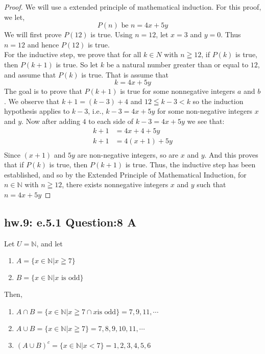 \begin{proof}
    

    We will use a extended principle of mathematical induction. For this proof, we let,
        \begin{equation*}
            P(n) \text{ be } n = 4x + 5y
        \end{equation*}
    We will first prove $P(12)$ is true. Using $n=12$, let $x=3$ and $y=0$. Thus $n=12$ and hence $P(12)$ is true. \\
    
    For the inductive step, we prove that for all $k \in N$ with $n \geqq 12$, if $P(k)$ is true, then $P(k+1)$ is true. So let $k$ be a natural number greater than or equal to $12$, and assume that $P(k)$ is true. That is assume that 
        \begin{equation*}
            k = 4x + 5y
        \end{equation*}
    The goal is to prove that $P(k+1)$ is true for some nonnegative integers $a$ and $b$. We observe that $k+1 = (k-3) + 4$ and $12 \leqq k-3 < k$ so the induction hypothesis applies to $k-3$, i.e., $k-3 = 4x + 5y$ for some non-negative integers $x$ and $y$. Now after adding $4$ to each side of $k-3 = 4x + 5y$ we see that:
        \begin{align*}
            k+1 & = 4x + 4 + 5y \\
            k+1 & = 4(x+1) + 5y \\
        \end{align*}
    Since $(x+1)$ and $5y$ are non-negative integers, so are $x$ and $y$. And this proves that if $P(k)$ is true, then $P(k+1)$ is true. Thus, the inductive step has been established, and so by the Extended Principle of Mathematical Induction, for $n \in \mathbb{N}$ with $n \geqq 12$, there exists nonnegative integers $x$ and $y$ such that $n = 4x + 5y$
\end{proof}


\newpage
\subsection{hw.9: e.5.1 Question:8 A}
Let $U = \mathbb{N}$, and let
    \begin{enumerate}
        \item $A = \{ x \in \mathbb{N} | x \geqq 7 \}$ 
        \item $B = \{ x \in \mathbb{N} | x \text{ is odd} \}$
    \end{enumerate}
Then,
 \begin{enumerate}
     \item $A \cap B = \{ x \in \mathbb{N} | x \geqq 7 \cap x \text{is odd} \} = 7, 9, 11, \cdots $
     \item $A \cup B = \{ x \in \mathbb{N} | x \geqq 7 \} = 7,8, 9, 10,11,  \cdots $
     \item $(A \cup B)^c = \{ x \in \mathbb{N} | x < 7 \} = 1,2, 3,4,5,6 $
 \end{enumerate}


